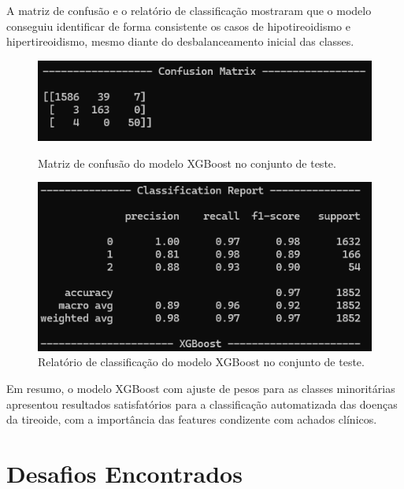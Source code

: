 \documentclass[11pt]{article}
\begin{document}
A matriz de confusão e o relatório de classificação mostraram que o modelo conseguiu identificar de forma consistente os casos de hipotireoidismo e hipertireoidismo, mesmo diante do desbalanceamento inicial das classes.

\begin{figure}[H]
    \centering
    \begin{minipage}{0.48\textwidth}
        \centering
        \includegraphics[width=\textwidth]{img/confusion_matrix.png}
        \caption{Matriz de confusão do modelo XGBoost no conjunto de teste.}
        \label{fig:confusion_matrix}
    \end{minipage}%
    \hfill
    \begin{minipage}{0.48\textwidth}
        \centering
        \includegraphics[width=\textwidth]{img/classification_report.png}
        \caption{Relatório de classificação do modelo XGBoost no conjunto de teste.}
        \label{fig:classification_report}
    \end{minipage}
\end{figure}

Em resumo, o modelo XGBoost com ajuste de pesos para as classes minoritárias apresentou resultados satisfatórios para a classificação automatizada das doenças da tireoide, com a importância das features condizente com achados clínicos.

\section{Desafios Encontrados}
\end{document}
